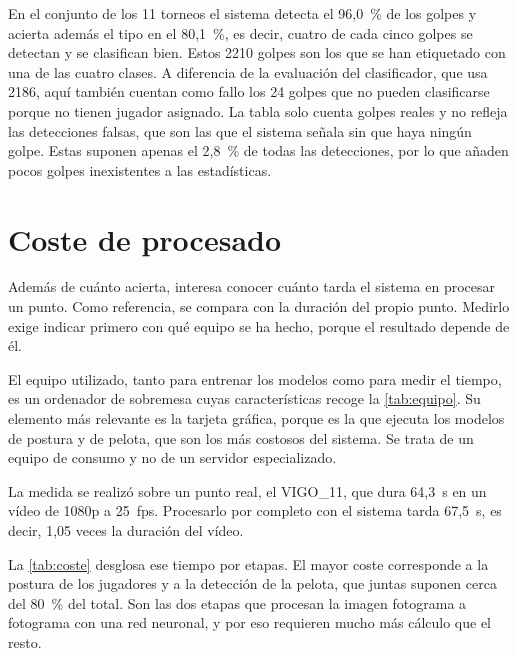 En el conjunto de los 11 torneos el sistema detecta el 96,0~\% de los golpes y acierta además el tipo en el 80,1~\%, es decir, cuatro de cada cinco golpes se detectan y se clasifican bien.
Estos 2210 golpes son los que se han etiquetado con una de las cuatro clases.
A diferencia de la evaluación del clasificador, que usa 2186, aquí también cuentan como fallo los 24 golpes que no pueden clasificarse porque no tienen jugador asignado.
La tabla solo cuenta golpes reales y no refleja las detecciones falsas, que son las que el sistema señala sin que haya ningún golpe.
Estas suponen apenas el 2,8~\% de todas las detecciones, por lo que añaden pocos golpes inexistentes a las estadísticas.

\section{Coste de procesado}
\label{sec:coste}

Además de cuánto acierta, interesa conocer cuánto tarda el sistema en procesar un punto.
Como referencia, se compara con la duración del propio punto.
Medirlo exige indicar primero con qué equipo se ha hecho, porque el resultado depende de él.

El equipo utilizado, tanto para entrenar los modelos como para medir el tiempo, es un ordenador de sobremesa cuyas características recoge la \cref{tab:equipo}.
Su elemento más relevante es la tarjeta gráfica, porque es la que ejecuta los modelos de postura y de pelota, que son los más costosos del sistema.
Se trata de un equipo de consumo y no de un servidor especializado.

\begin{table}[htbp]
  \centering
  \caption{Equipo con el que se ha medido el coste de procesado.}
  \label{tab:equipo}
  
\end{table}

La medida se realizó sobre un punto real, el VIGO\_11, que dura 64,3~s en un vídeo de 1080p a 25~\ac{fps}.
Procesarlo por completo con el sistema tarda 67,5~s, es decir, 1,05 veces la duración del vídeo.

La \cref{tab:coste} desglosa ese tiempo por etapas.
El mayor coste corresponde a la postura de los jugadores y a la detección de la pelota, que juntas suponen cerca del 80~\% del total.
Son las dos etapas que procesan la imagen fotograma a fotograma con una red neuronal, y por eso requieren mucho más cálculo que el resto.

\begin{table}[htbp]
  \centering
  \caption{Tiempo de procesado de un punto, por etapa.}
  \label{tab:coste}
  
\end{table}

